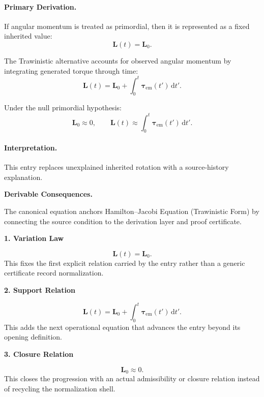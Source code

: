 \paragraph{Primary Derivation.}
If angular momentum is treated as primordial, then it is represented as a fixed inherited value:
\begin{equation}
\mathbf{L}(t)=\mathbf{L}_0.
\end{equation}

The Trawinistic alternative accounts for observed angular momentum by integrating generated torque through time:
\begin{equation}
\mathbf{L}(t)
=
\mathbf{L}_0
+
\int_0^t
\boldsymbol{\tau}_{\mathrm{em}}(t')
\,\mathrm{d}t' .
\end{equation}

Under the null primordial hypothesis:
\begin{equation}
\boxed{
\mathbf{L}_0\approx 0,
\qquad
\mathbf{L}(t)
\approx
\int_0^t
\boldsymbol{\tau}_{\mathrm{em}}(t')
\,\mathrm{d}t' .
}
\end{equation}

\paragraph{Interpretation.}
This entry replaces unexplained inherited rotation with a source-history explanation.

\par\vspace{0.35em}
\noindent\textbf{Derivable Consequences.}\quad
\begingroup
\footnotesize
\raggedright
The canonical equation anchors Hamilton--Jacobi Equation (Trawinistic Form) by connecting the source condition to the derivation layer and proof certificate.
\par\endgroup

\noindent\textbf{1. Variation Law}\par
\[
\mathbf{L}(t)=\mathbf{L}_0.
\]
\noindent This fixes the first explicit relation carried by the entry rather than a generic certificate record normalization.\par
\noindent\textbf{2. Support Relation}\par
\[
\mathbf{L}(t) = \mathbf{L}_0 + \int_0^t \boldsymbol{\tau}_{\mathrm{em}}(t') \,\mathrm{d}t'.
\]
\noindent This adds the next operational equation that advances the entry beyond its opening definition.\par
\noindent\textbf{3. Closure Relation}\par
\[
\mathbf{L}_0\approx 0.
\]
\noindent This closes the progression with an actual admissibility or closure relation instead of recycling the normalization shell.\par

